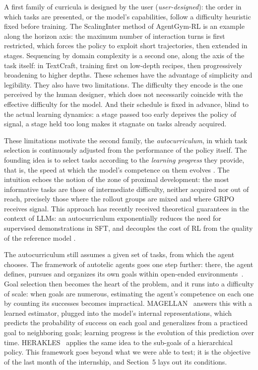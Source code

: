 \documentclass[11pt,a4paper]{article}
\begin{document}
A first family of curricula is designed by the user (\emph{user-designed}): the order in which tasks are presented, or the model's capabilities, follow a difficulty heuristic fixed before training. The ScalingInter method of AgentGym-RL \cite{xi_agentgym-rl_2025} is an example along the horizon axis: the maximum number of interaction turns is first restricted, which forces the policy to exploit short trajectories, then extended in stages. Sequencing by domain complexity is a second one, along the axis of the task itself: in TextCraft, training first on low-depth recipes, then progressively broadening to higher depths. These schemes have the advantage of simplicity and legibility. They also have two limitations. The difficulty they encode is the one perceived by the human designer, which does not necessarily coincide with the effective difficulty for the model. And their schedule is fixed in advance, blind to the actual learning dynamics: a stage passed too early deprives the policy of signal, a stage held too long makes it stagnate on tasks already acquired.

These limitations motivate the second family, the \emph{autocurriculum}, in which task selection is continuously adjusted from the performance of the policy itself. The founding idea is to select tasks according to the \emph{learning progress} they provide, that is, the speed at which the model's competence on them evolves \cite{graves2017automated}. The intuition echoes the notion of the zone of proximal development: the most informative tasks are those of intermediate difficulty, neither acquired nor out of reach, precisely those where the rollout groups are mixed and where GRPO receives signal. This approach has recently received theoretical guarantees in the context of LLMs: an autocurriculum exponentially reduces the need for supervised demonstrations in SFT, and decouples the cost of RL from the quality of the reference model \cite{rajaraman2026curriculum}.



The autocurriculum still assumes a given set of tasks, from which the agent chooses. The framework of autotelic agents goes one step further: there, the agent defines, pursues and organizes its own goals within open-ended environments~\cite{colas2022autotelic}. Goal selection then becomes the heart of the problem, and it runs into a difficulty of scale: when goals are numerous, estimating the agent's competence on each one by counting its successes becomes impractical. MAGELLAN~\cite{gaven2025magellan} answers this with a learned estimator, plugged into the model's internal representations, which predicts the probability of success on each goal and generalizes from a practiced goal to neighboring goals; learning progress is the evolution of this prediction over time. HERAKLES~\cite{carta2025herakles} applies the same idea to the sub-goals of a hierarchical policy. This framework goes beyond what we were able to test; it is the objective of the last month of the internship, and Section~5 lays out its conditions.
\end{document}

